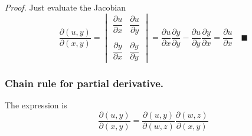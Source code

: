 \documentclass[../../../main.tex]{subfiles}
\begin{document}
\emph{Proof.} Just evaluate the Jacobian
\begin{equation*}
    \frac{\partial (u,y)}{\partial (x,y)}=\begin{vmatrix}
        \dfrac{\partial u}{\partial x} & \dfrac{\partial u}{\partial y} \\
        \\
        \dfrac{\partial y}{\partial x} & \dfrac{\partial y}{\partial y}
    \end{vmatrix}
    =\dfrac{\partial u}{\partial x} \dfrac{\partial y}{\partial y}-\dfrac{\partial u}{\partial y} \dfrac{\partial y}{\partial x} =\dfrac{\partial u}{\partial x}\quad \blacksquare
\end{equation*}

\subsubsection{Chain rule for partial derivative.} The expression is
\begin{equation*}
    \frac{\partial (u,y)}{\partial (x,y)}= \frac{\partial (u,y)}{\partial (w,z)}\frac{\partial (w,z)}{\partial (x,y)}
\end{equation*}
\end{document}
